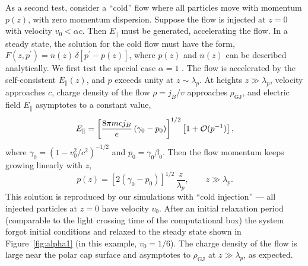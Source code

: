 As a second test, consider a ``cold'' flow where all particles move with
momentum $p(z)$, with zero momentum dispersion. Suppose the flow is injected
at $z=0$ with velocity $v_0<\alpha c$. Then $E_\parallel$ must be generated,
accelerating the flow. In a steady state, the solution for the cold flow must have
the form, $F(z,p^\prime)=n(z)\,\delta[p^\prime-p(z)]$, where $p(z)$ and $n(z)$ can
be described analytically. We first test the special case $\alpha=1$
\citep{michel_rotating_1974}.
The flow is accelerated by the self-consistent $E_\parallel(z)$, and $p$ exceeds
unity at $z\sim\lambda_p$. At heights $z\gg \lambda_p$, velocity approaches $c$,
charge density of the flow $\rho=j_B/v$ approaches $\rho_\mathrm{GJ}$, and
electric field $E_\parallel$ asymptotes to a constant value,
\begin{equation}
   E_\parallel=\left[\frac{8\pi m cj_B}{e}\left(\gamma_0-p_0\right)\right]^{1/2}
                      \left[1+{\cal O}(p^{-1})\right],
\end{equation}
where $\gamma_0=(1-v_0^2/c^2)^{-1/2}$ and $p_0=\gamma_0\beta_0$.
Then the flow momentum keeps growing linearly with $z$,
\begin{equation}
     p(z)=\left[2(\gamma_0-p_0)\right]^{1/2}\,\frac{z}{\lambda_p}, \qquad z\gg\lambda_p.
\end{equation}
This solution is reproduced by our simulations with ``cold injection'' --- all injected
particles at $z=0$ have velocity $v_0$. After an initial relaxation period
(comparable to the light crossing time of the computational box) the system
forgot initial conditions and relaxed to the steady state shown in Figure~\ref{fig:alpha1}
(in this example, $v_0=1/6$).
The charge density of the flow is large near the polar cap surface and asymptotes
to $\rho_\mathrm{GJ}$ at $z\gg\lambda_p$, as expected.

\bigskip

